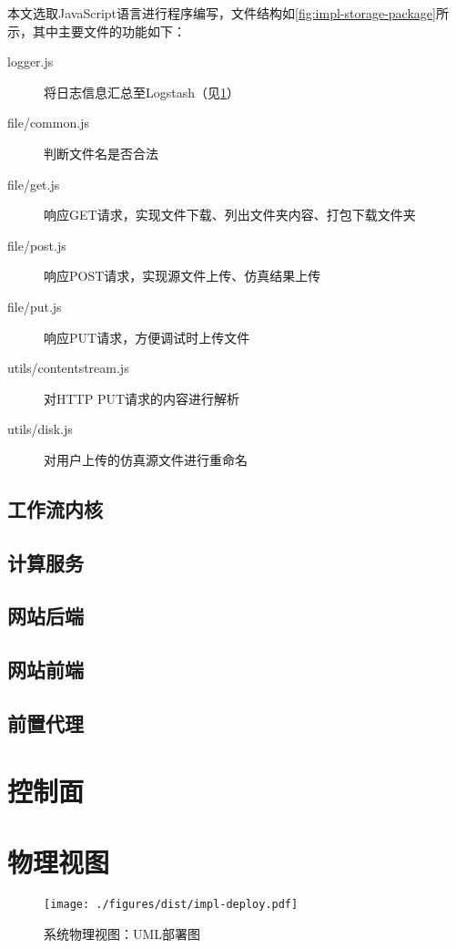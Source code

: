 \documentclass[index]{subfiles}
\begin{document}
本文选取JavaScript语言进行程序编写，文件结构如\cref{fig:impl-storage-package}所示，其中主要文件的功能如下：
\begin{description}
  \item[logger.js] 将日志信息汇总至Logstash（见\cref{sec:impl-elk}）
  \item[file/common.js] 判断文件名是否合法
  \item[file/get.js] 响应GET请求，实现文件下载、列出文件夹内容、打包下载文件夹
  \item[file/post.js] 响应POST请求，实现源文件上传、仿真结果上传
  \item[file/put.js] 响应PUT请求，方便调试时上传文件
  \item[utils/contentstream.js] 对HTTP PUT请求的内容进行解析
  \item[utils/disk.js] 对用户上传的仿真源文件进行重命名
\end{description}

\subsection{工作流内核}
\subsection{计算服务}
\subsection{网站后端}
\subsection{网站前端}
\subsection{前置代理}

\section{控制面}\label{sec:impl-elk}
\section{物理视图}
\begin{figure}[h]
  \centering
  \texttt{[image: ./figures/dist/impl-deploy.pdf]}
  \caption{系统物理视图：UML部署图\label{fig:impl-deploy}}
\end{figure}
\end{document}
